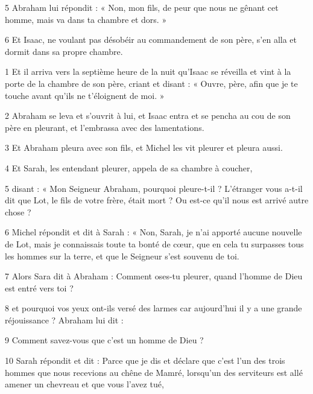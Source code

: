 \par 5 Abraham lui répondit : « Non, mon fils, de peur que nous ne gênant cet homme, mais va dans ta chambre et dors. »

\par 6 Et Isaac, ne voulant pas désobéir au commandement de son père, s'en alla et dormit dans sa propre chambre.


\par 1 Et il arriva vers la septième heure de la nuit qu'Isaac se réveilla et vint à la porte de la chambre de son père, criant et disant : « Ouvre, père, afin que je te touche avant qu'ils ne t'éloignent de moi. »

\par 2 Abraham se leva et s'ouvrit à lui, et Isaac entra et se pencha au cou de son père en pleurant, et l'embrassa avec des lamentations.

\par 3 Et Abraham pleura avec son fils, et Michel les vit pleurer et pleura aussi.

\par 4 Et Sarah, les entendant pleurer, appela de sa chambre à coucher,

\par 5 disant : « Mon Seigneur Abraham, pourquoi pleure-t-il ? L'étranger vous a-t-il dit que Lot, le fils de votre frère, était mort ? Ou est-ce qu’il nous est arrivé autre chose ?

\par 6 Michel répondit et dit à Sarah : « Non, Sarah, je n'ai apporté aucune nouvelle de Lot, mais je connaissais toute ta bonté de cœur, que en cela tu surpasses tous les hommes sur la terre, et que le Seigneur s'est souvenu de toi.

\par 7 Alors Sara dit à Abraham : Comment oses-tu pleurer, quand l'homme de Dieu est entré vers toi ?

\par 8 et pourquoi vos yeux ont-ils versé des larmes car aujourd'hui il y a une grande réjouissance ? Abraham lui dit :

\par 9 Comment savez-vous que c'est un homme de Dieu ?

\par 10 Sarah répondit et dit : Parce que je dis et déclare que c'est l'un des trois hommes que nous recevions au chêne de Mamré, lorsqu'un des serviteurs est allé amener un chevreau et que vous l'avez tué,

